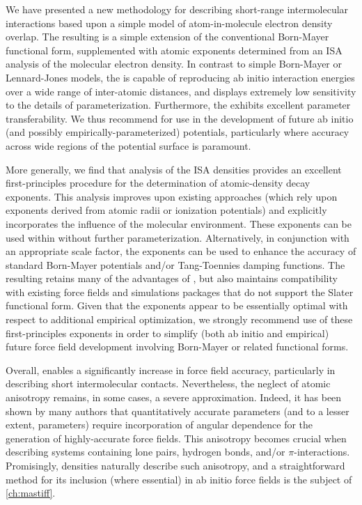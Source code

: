 We have presented a new methodology for describing short-range intermolecular
interactions based upon a simple model of atom-in-molecule electron density
overlap. The resulting \isaffold is a simple extension of the conventional
Born-Mayer functional form, supplemented with atomic exponents determined from
an ISA analysis of the molecular electron density. 
In contrast to simple Born-Mayer or Lennard-Jones models, the \isaffold is capable of
reproducing ab initio interaction energies over a wide range of inter-atomic
distances, and displays
extremely low sensitivity to the details of parameterization. Furthermore, the
\isaffold exhibits excellent parameter transferability. We thus recommend
\isaffold for use in the development of future ab initio (and possibly
empirically-parameterized) potentials, particularly where accuracy across wide
regions of the potential surface is paramount. 

More generally, we find that analysis of the ISA densities provides an
excellent first-principles procedure for the determination of atomic-density
decay exponents.  This analysis improves upon existing approaches (which rely
upon exponents derived from atomic radii or ionization
potentials)\cite{Rappe1992, Mayo1990, Lim2009, VanDuin2001} and explicitly
incorporates the influence of the molecular environment.  These exponents can
be used within \isaffold without further parameterization.  Alternatively, in
conjunction with an appropriate scale factor, the exponents can be used to
enhance the accuracy of standard Born-Mayer potentials and/or Tang-Toennies
damping functions. The resulting \bmsisaff retains many of the advantages of
\isaffold, but also maintains compatibility with existing force fields and
simulations packages that do not support the Slater functional form.  
Given that the \bsisa exponents appear to be essentially
optimal with respect to additional empirical optimization, we strongly
recommend use of these first-principles exponents in order to simplify 
(both ab initio and empirical) future force field development involving Born-Mayer
or related functional forms.\cite{Gordon2006}

Overall, \isaffold enables a significantly increase in force field accuracy,
particularly in describing short intermolecular contacts. Nevertheless, the
neglect of atomic anisotropy remains, in some cases, a severe approximation.
\cite{Eramian2013, Badenhoop1997, Kim2014b}
Indeed, it has been shown by many
authors\cite{stone2013theory,Day2003,Totton2010a,Wheatley1990} that
quantitatively accurate \A parameters (and to a lesser extent, \B parameters)
require incorporation of angular dependence for the generation of
highly-accurate force fields. This anisotropy becomes crucial when describing
systems containing lone pairs, hydrogen bonds, and/or $\pi$-interactions.
Promisingly, \bsisa densities naturally describe such anisotropy, 
\cite{Wheatley2012,Misquitta2015a,Misquitta2015b}
and a straightforward method for its inclusion (where essential) in
ab initio force fields is the subject of \cref{ch:mastiff}.
